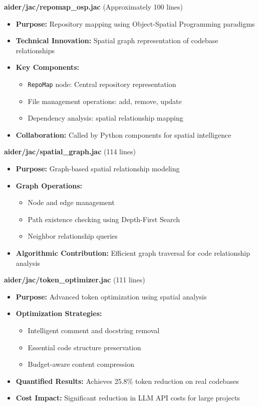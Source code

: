 \documentclass[12pt,a4paper]{article}
\begin{document}
\textbf{aider/jac/repomap\_osp.jac} (Approximately 100 lines)
\begin{itemize}
    \item \textbf{Purpose:} Repository mapping using Object-Spatial Programming paradigms
    \item \textbf{Technical Innovation:} Spatial graph representation of codebase relationships
    \item \textbf{Key Components:}
    \begin{itemize}
        \item \texttt{RepoMap} node: Central repository representation
        \item File management operations: add, remove, update
        \item Dependency analysis: spatial relationship mapping
    \end{itemize}
    \item \textbf{Collaboration:} Called by Python components for spatial intelligence
\end{itemize}

\textbf{aider/jac/spatial\_graph.jac} (114 lines)
\begin{itemize}
    \item \textbf{Purpose:} Graph-based spatial relationship modeling
    \item \textbf{Graph Operations:}
    \begin{itemize}
        \item Node and edge management
        \item Path existence checking using Depth-First Search
        \item Neighbor relationship queries
    \end{itemize}
    \item \textbf{Algorithmic Contribution:} Efficient graph traversal for code relationship analysis
\end{itemize}

\textbf{aider/jac/token\_optimizer.jac} (111 lines)
\begin{itemize}
    \item \textbf{Purpose:} Advanced token optimization using spatial analysis
    \item \textbf{Optimization Strategies:}
    \begin{itemize}
        \item Intelligent comment and docstring removal
        \item Essential code structure preservation
        \item Budget-aware content compression
    \end{itemize}
    \item \textbf{Quantified Results:} Achieves 25.8\% token reduction on real codebases
    \item \textbf{Cost Impact:} Significant reduction in LLM API costs for large projects
\end{itemize}
\end{document}
